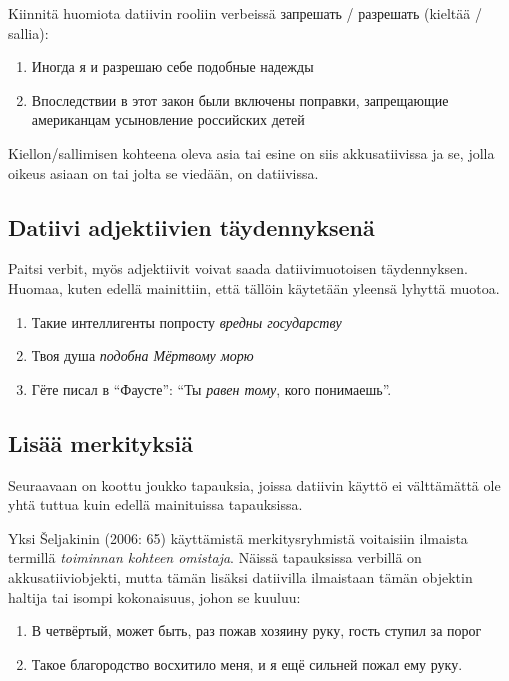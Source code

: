 \documentclass[]{scrreprt}
\providecommand{\tightlist}{%
  \setlength{\itemsep}{0pt}\setlength{\parskip}{0pt}}
\begin{document}
Kiinnitä huomiota datiivin rooliin verbeissä запрешать / разрешать
(kieltää / sallia):

\begin{enumerate}
\def\labelenumi{(\arabic{enumi})}
\setcounter{enumi}{97}
\tightlist
\item
  Иногда я и разрешаю себе подобные надежды
\item
  Впоследствии в этот закон были включены поправки, запрещающие
  американцам усыновление российских детей
\end{enumerate}

Kiellon/sallimisen kohteena oleva asia tai esine on siis akkusatiivissa
ja se, jolla oikeus asiaan on tai jolta se viedään, on datiivissa.

\subsection{Datiivi adjektiivien
täydennyksenä}\label{datiivi-adjektiivien-tuxe4ydennyksenuxe4}

Paitsi verbit, myös adjektiivit voivat saada datiivimuotoisen
täydennyksen. Huomaa, kuten edellä mainittiin, että tällöin käytetään
yleensä lyhyttä muotoa.

\begin{enumerate}
\def\labelenumi{(\arabic{enumi})}
\setcounter{enumi}{99}
\tightlist
\item
  Такие интеллигенты попросту \emph{вредны государству}
\item
  Твоя душа \emph{подобна Мёртвому морю}
\item
  Гёте писал в ``Фаусте'': ``Ты \emph{равен тому}, кого понимаешь''.
\end{enumerate}

\subsection{Lisää merkityksiä}\label{lisuxe4uxe4-merkityksiuxe4}

Seuraavaan on koottu joukko tapauksia, joissa datiivin käyttö ei
välttämättä ole yhtä tuttua kuin edellä mainituissa tapauksissa.

Yksi Šeljakinin (2006: 65) käyttämistä merkitysryhmistä voitaisiin
ilmaista termillä \emph{toiminnan kohteen omistaja}. Näissä tapauksissa
verbillä on akkusatiiviobjekti, mutta tämän lisäksi datiivilla
ilmaistaan tämän objektin haltija tai isompi kokonaisuus, johon se
kuuluu:

\begin{enumerate}
\def\labelenumi{(\arabic{enumi})}
\setcounter{enumi}{102}
\tightlist
\item
  В четвёртый, может быть, раз пожав хозяину руку, гость ступил за порог
\item
  Такое благородство восхитило меня, и я ещё сильней пожал ему руку.
\end{enumerate}
\end{document}
